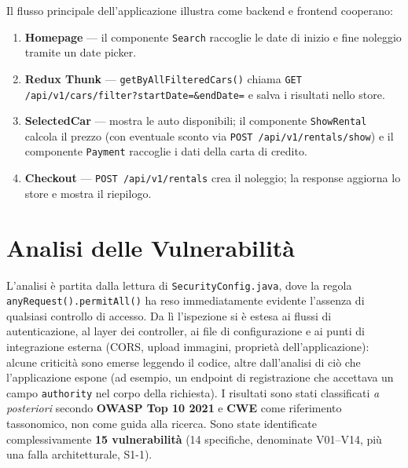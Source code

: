 \documentclass[12pt, a4paper]{article}
\begin{document}
    Il flusso principale dell'applicazione illustra come backend e frontend
    cooperano:

    \begin{enumerate}
        \item \textbf{Homepage} --- il componente \texttt{Search} raccoglie le date
        di inizio e fine noleggio tramite un date picker.
        \item \textbf{Redux Thunk} --- \texttt{getByAllFilteredCars()} chiama
        \texttt{GET /api/v1/cars/filter?startDate=\&endDate=} e salva i
        risultati nello store.
        \item \textbf{SelectedCar} --- mostra le auto disponibili; il componente
        \texttt{ShowRental} calcola il prezzo (con eventuale sconto via
        \texttt{POST /api/v1/rentals/show}) e il componente \texttt{Payment}
        raccoglie i dati della carta di credito.
        \item \textbf{Checkout} --- \texttt{POST /api/v1/rentals} crea il noleggio;
        la response aggiorna lo store e mostra il riepilogo.
    \end{enumerate}

    \section{Analisi delle Vulnerabilit\`a}
    \label{sec:vulnerabilities}

    L'analisi è partita dalla lettura di \texttt{SecurityConfig.java}, dove la regola
    \texttt{anyRequest().permitAll()} ha reso immediatamente evidente l'assenza di qualsiasi
    controllo di accesso. Da lì l'ispezione si è estesa ai flussi di autenticazione, al
    layer dei controller, ai file di configurazione e ai punti di integrazione esterna (CORS,
    upload immagini, proprietà dell'applicazione): alcune criticità sono emerse leggendo il
    codice, altre dall'analisi di ciò che l'applicazione espone (ad esempio, un endpoint di
    registrazione che accettava un campo \texttt{authority} nel corpo della richiesta). I
    risultati sono stati classificati \textit{a posteriori} secondo \textbf{OWASP Top 10 2021}
    e \textbf{CWE} come riferimento tassonomico, non come guida alla ricerca.
    Sono state identificate complessivamente \textbf{15 vulnerabilità}
    (14 specifiche, denominate V01--V14, più una falla architetturale, S1-1).
\end{document}
